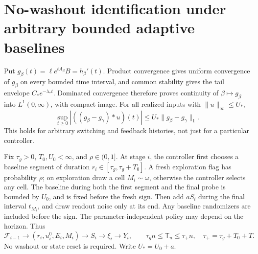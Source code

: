 \section{No-washout identification under arbitrary bounded adaptive baselines}
\label{sec:linear-time-protocol}
Put \(g_\beta(t)=\ell e^{tA_\beta}B=h_\beta'(t)\).
Product convergence gives uniform convergence of \(g_\beta\) on every
bounded time interval, and common stability gives the tail envelope
\(C_*e^{-\lambda_*t}\). Dominated convergence therefore proves
continuity of \(\beta\mapsto g_\beta\) into \(L^1(0,\infty)\), with
compact image. For all realized inputs with \(\|u\|_\infty\le U_*\),
\begin{equation}
 \sup_{t\ge0}|((g_\beta-g_\gamma)*u)(t)|
 \le U_*\|g_\beta-g_\gamma\|_1.
 \label{eq:policy-uniform-convolution}
\end{equation}
This holds for arbitrary switching and feedback histories, not just for a
particular controller.

Fix \(\tau_g>0\), \(T_0,U_0<\infty\), and \(\rho\in(0,1]\).
At stage \(i\), the controller first chooses a baseline segment of duration
\(r_i\in[\tau_g,\tau_g+T_0]\). A fresh exploration flag has probability
\(\rho\); on exploration draw a cell \(M_i\sim\omega\), otherwise the
controller selects any cell. The baseline during both the first segment and
the final probe is bounded by \(U_0\), and is fixed before the fresh sign.
Then add \(aS_i\) during the final interval \(t_{M_i}\), and draw readout
noise only at its end. Any baseline randomizers are included before the
sign. The parameter-independent policy may depend on the horizon. Thus
\begin{equation}
 \mathcal F_{i-1}\longrightarrow(r_i,u_i^0,E_i,M_i)
 \longrightarrow S_i\longrightarrow\xi_i\longrightarrow Y_i,
 \qquad \tau_g n\le\mathsf T_n\le\tau_+n,
 \quad\tau_+=\tau_g+T_0+T.
 \label{eq:linear-time-chronology}
\end{equation}
No washout or state reset is required. Write \(U_*=U_0+a\).

